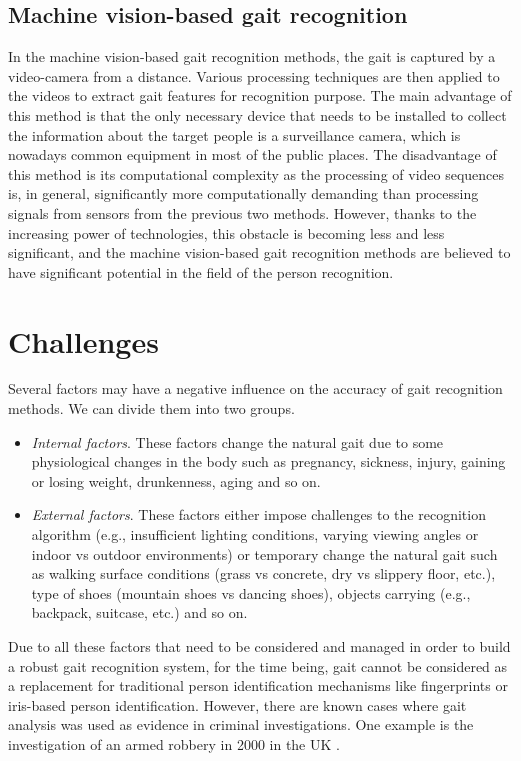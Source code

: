 \subsection{Machine vision-based gait recognition}
In the machine vision-based gait recognition methods, the gait is captured by a video-camera from a distance. Various processing techniques are then applied to the videos to extract gait features for recognition purpose. The main advantage of this method is that the only necessary device that needs to be installed to collect the information about the target people is a surveillance camera, which is nowadays common equipment in most of the public places. The disadvantage of this method is its computational complexity as the processing of video sequences is, in general, significantly more computationally demanding than processing signals from sensors from the previous two methods. However, thanks to the increasing power of technologies, this obstacle is becoming less and less significant, and the machine vision-based gait recognition methods are believed to have significant potential in the field of the person recognition.

\section{Challenges}
Several factors may have a negative influence on the accuracy of gait recognition methods. We can divide them into two groups.
\begin{itemize}
    \item \textit{Internal factors}. These factors change the natural gait due to some physiological changes in the body such as pregnancy, sickness, injury, gaining or losing weight, drunkenness, aging and so on. 
    \item \textit{External factors}. These factors either impose challenges to the recognition algorithm (e.g., insufficient lighting conditions, varying viewing angles or indoor vs outdoor environments) or temporary change the natural gait such as walking surface conditions (grass vs concrete, dry vs slippery floor, etc.), type of shoes (mountain shoes vs dancing shoes), objects carrying (e.g., backpack, suitcase, etc.) and so on.
\end{itemize}
\bigbreak
Due to all these factors that need to be considered and managed in order to build a robust gait recognition system, for the time being, gait cannot be considered as a replacement for traditional person identification mechanisms like fingerprints or iris-based person identification. However, there are known cases where gait analysis was used as evidence in criminal investigations. One example is the investigation of an armed robbery in 2000 in the UK \cite{forensic_gait_analys}.